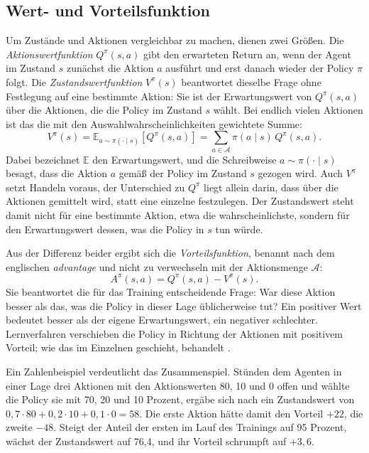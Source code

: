 \subsection{Wert- und Vorteilsfunktion}
\label{sec:wertfunktion}

Um Zustände und Aktionen vergleichbar zu machen, dienen zwei Größen. Die
\emph{Aktionswertfunktion} $Q^{\pi}(s,a)$ gibt den erwarteten Return an, wenn
der Agent im Zustand $s$ zunächst die Aktion $a$ ausführt und erst danach wieder
der Policy $\pi$ folgt. Die \emph{Zustandswertfunktion} $V^{\pi}(s)$ beantwortet
dieselbe Frage ohne Festlegung auf eine bestimmte Aktion: Sie ist der
Erwartungswert von $Q^{\pi}(s,a)$ über die Aktionen, die die Policy im Zustand
$s$ wählt. Bei endlich vielen Aktionen ist das die mit den
Auswahlwahrscheinlichkeiten gewichtete Summe:
%
\begin{equation}
  V^{\pi}(s)
    = \mathbb{E}_{a \sim \pi(\cdot \mid s)}\!\left[Q^{\pi}(s,a)\right]
    = \sum_{a \in \mathcal{A}} \pi(a \mid s)\, Q^{\pi}(s,a).
  \label{eq:v-aus-q}
\end{equation}
%
Dabei bezeichnet $\mathbb{E}$ den Erwartungswert, und die Schreibweise
$a \sim \pi(\cdot \mid s)$ besagt, dass die Aktion $a$ gemäß der Policy im
Zustand $s$ gezogen wird. Auch $V^{\pi}$ setzt Handeln voraus, der Unterschied
zu $Q^{\pi}$ liegt allein darin, dass über die Aktionen gemittelt wird, statt
eine einzelne festzulegen. Der Zustandswert steht damit nicht für eine bestimmte
Aktion, etwa die wahrscheinlichste, sondern für den Erwartungswert dessen, was
die Policy in $s$ tun würde.

Aus der Differenz beider ergibt sich die \emph{Vorteilsfunktion}, benannt nach
dem englischen \emph{advantage} und nicht zu verwechseln mit der Aktionsmenge
$\mathcal{A}$:
%
\begin{equation}
  A^{\pi}(s,a) = Q^{\pi}(s,a) - V^{\pi}(s).
  \label{eq:advantage}
\end{equation}
%
Sie beantwortet die für das Training entscheidende Frage: War diese Aktion
besser als das, was die Policy in dieser Lage üblicherweise tut? Ein positiver
Wert bedeutet besser als der eigene Erwartungswert, ein negativer schlechter.
Lernverfahren verschieben die Policy in Richtung der Aktionen mit positivem
Vorteil; wie das im Einzelnen geschieht, behandelt .

Ein Zahlenbeispiel verdeutlicht das Zusammenspiel. Stünden dem Agenten in einer
Lage drei Aktionen mit den Aktionswerten 80, 10 und 0 offen und wählte die
Policy sie mit 70, 20 und 10 Prozent, ergäbe sich nach  ein
Zustandswert von $0{,}7 \cdot 80 + 0{,}2 \cdot 10 + 0{,}1 \cdot 0 = 58$. Die
erste Aktion hätte damit den Vorteil $+22$, die zweite $-48$. Steigt der Anteil
der ersten im Lauf des Trainings auf 95 Prozent, wächst der Zustandswert auf
76{,}4, und ihr Vorteil schrumpft auf $+3{,}6$.

